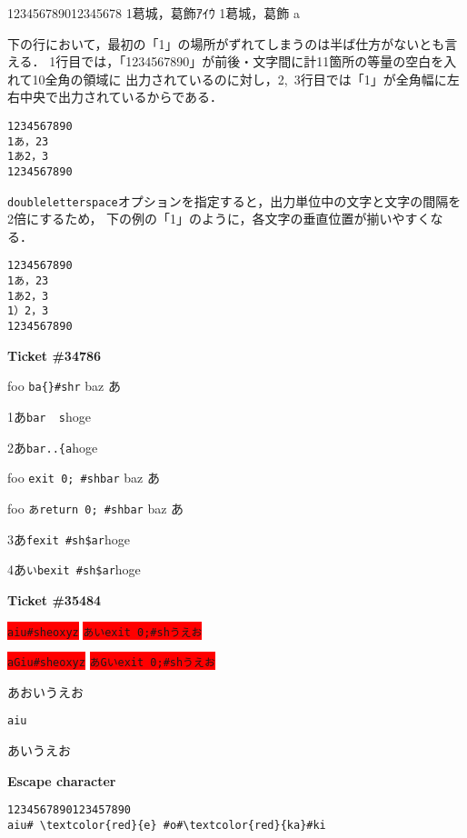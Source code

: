 \documentclass{article}
\begin{document}
\begin{LTXexample}[escapechar=\%,vsraw=true, basicstyle=\tt]
123456789012345678
1葛󠄀城，葛󠄁飾ｱｲｳ
1葛󠄀城，葛󠄁飾
󠄀a
\end{LTXexample}

\newpage

下の行において，最初の「1」の場所がずれてしまうのは半ば仕方がないとも言える．
1行目では，「1234567890」が前後・文字間に計11箇所の等量の空白を入れて10全角の領域に
出力されているのに対し，2,~3行目では「1」が全角幅に左右中央で出力されているからである．
\begin{lstlisting}[escapechar=\%,vsraw, basewidth=1\zw, basicstyle=\tt]
1234567890
1あ，23
1あ2，3
1234567890
\end{lstlisting}

\texttt{doubleletterspace}オプションを指定すると，出力単位中の文字と文字の間隔を2倍にするため，
下の例の「1」のように，各文字の垂直位置が揃いやすくなる．
\begin{lstlisting}[escapechar=\%,doubleletterspace, basewidth=1\zw, basicstyle=\tt]
1234567890
1あ，23
1あ2，3
1）2，3
1234567890
\end{lstlisting}


\newpage
\textbf{Ticket \#34786}

foo \lstinline[basicstyle=\tt]!ba{}#shr! baz あ

1あ\lstinline[basicstyle=\tt]{bar  s}hoge

2あ\lstinline[basicstyle=\tt]{bar..{a}hoge

foo \lstinline[basicstyle=\tt\gtfamily]!exit 0; #shbar! baz あ

foo \lstinline[basicstyle=\tt\gtfamily]!あreturn 0; #shbar! baz あ

3あ\lstinline[basicstyle=\tt]{fexit #sh$ar}hoge

4あ\lstinline[basicstyle=\tt]{いbexit #sh$ar}hoge

\bigskip
\textbf{Ticket \#35484}

\colorbox{red}{\lstinline!aiu#sheoxyz!}
\colorbox{red}{\lstinline!あいexit 0;#shうえお!}


\colorbox{red}{\lstinline{aGiu#sheoxyz}}
\colorbox{red}{\lstinline{あGいexit 0;#shうえお}}

あおいうえお
\begin{lstlisting}[frame=single]
aiu
\end{lstlisting}
あいうえお

\bigskip
\textbf{Escape character}
\begin{lstlisting}[escapechar=\#,basicstyle=\ttfamily]
1234567890123457890
aiu# \textcolor{red}{e} #o#\textcolor{red}{ka}#ki
\end{lstlisting}
\end{document}
